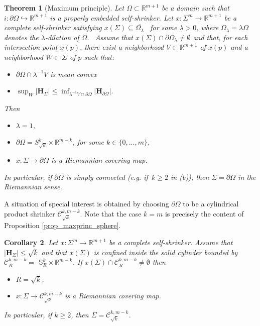 \documentclass[11pt,leqno]{amsart}\usepackage{amsmath}
\newtheorem{theorem}{Theorem}
\newtheorem{corollary}[theorem]{Corollary}
\numberwithin{equation}{section}
\begin{document}
\begin{theorem}[Maximum principle]\label{th_maxprinc}
Let $\Omega\subset\mathbb{R}^{m+1}$ be a domain such that
$i:\partial\Omega\hookrightarrow\mathbb{R}^{m+1}$ is a properly embedded
self-shrinker. Let $x\colon \Sigma^{m}\rightarrow\mathbb{R}^{m+1}$ be a complete
self-shrinker satisfying $x\left(  \Sigma\right)  \subseteq\overline
{\Omega_{\lambda}}$ \ for some $\lambda>0$, where $\Omega_{\lambda}=\lambda\Omega$ denotes the $\lambda$-dilation of $\Omega$. \ Assume that
$x\left(  \Sigma\right)  \cap\partial\Omega_{\lambda}\neq\emptyset$ and that, for each intersection point $x(p)$,
there exist a neighborhood $V\subset \mathbb{R}^{m+1}$ of $x(p)$ and a neighborhood $W \subset \Sigma$ of $p$ such that:
\begin{itemize}
\item[(i)]  $\partial \Omega\cap \lambda^{-1}V$ is mean convex
\item[(ii)] $\sup_{W}\left\vert \mathbf{H}_{\Sigma}\right\vert \leq\inf_{\lambda^{-1}V \cap \partial\Omega} \left\vert \mathbf{H}_{\partial\Omega}\right\vert$.
\end{itemize}
Then
\begin{itemize}
\item[(a)] $\lambda=1$,
\item[(b)] $\partial \Omega = S^{k}_{\sqrt{k}} \times \mathbb{R}^{m-k}$, for some $k\in\{0,...,m\}$,
\item[(c)] $x:\Sigma\rightarrow\partial\Omega$ is a Riemannian covering map.
\end{itemize}
In particular, if $\partial \Omega$ is simply connected (e.g. if $\,k \geq 2$ in (b)), then $\Sigma=\partial\Omega$ in
the Riemannian sense.
\end{theorem}

A situation of special interest is obtained by choosing $\partial \Omega$ to be a cylindrical product shrinker $\mathcal{C}^{k,m-k}_{\sqrt{k}}$. Note that
the case $k=m$ is precisely the content of Proposition \ref{prop_maxprinc_sphere}.
\begin{corollary}
Let $x\colon \Sigma^{m}\rightarrow\mathbb{R}^{m+1}$ be a complete self-shrinker. Assume that
$\left\vert \mathbf{H}_{\Sigma}\right\vert \leq\sqrt
{k}$ and that $x\left(  \Sigma\right)  $ is confined inside the solid
cylinder bounded by $\mathcal{C}^{k,m-k}_{R}=$ $\mathbb{S}_{R}^{k}\times\mathbb{R}^{m-k}$.
If $x\left(  \Sigma\right)  \cap\mathcal{C}^{k,m-k}_{R}\neq\emptyset$ then
\begin{itemize}
\item[(a)] $R=\sqrt{k}$,
\item[(b)] $x:\Sigma \rightarrow\mathcal{C}^{k,m-k}_{\sqrt{k}}$ is a Riemannian covering map.
\end{itemize}
In particular, if $k\geq2$, then $\Sigma=\mathcal{C}^{k,m-k}_{\sqrt{k}}$.
\end{corollary}
\end{document}
